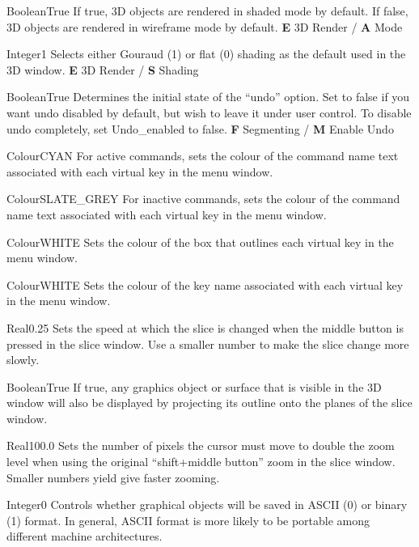 {Boolean}{True}
{If true, 3D objects are rendered in shaded mode by default. If false, 3D objects are rendered in wireframe mode by default.}
{{\bf E} 3D Render / {\bf A} Mode}

{Integer}{1}
{Selects either Gouraud (1) or flat (0) shading as the default used in the 3D window.}
{{\bf E} 3D Render / {\bf S} Shading}

{Boolean}{True}
{Determines the initial state of the ``undo'' option. Set to false if you want undo disabled by default, but wish to leave it under user control. To disable undo completely, set Undo\_enabled to false.}
{{\bf F} Segmenting / {\bf M} Enable Undo}

 {Colour}{CYAN}
{For active commands, sets the colour of the command name text
  associated with each virtual key in the menu window.}{}

 {Colour}{SLATE\_GREY}
{For inactive commands, sets the colour of the command name text
  associated with each virtual key in the menu window.}{}

{Colour}{WHITE}
{Sets the colour of the box that outlines each virtual key in the menu window.}{}

{Colour}{WHITE}
{Sets the colour of the key name associated with each virtual key in the menu window.}{}

{Real}{0.25}
{Sets the speed at which the slice is changed when the middle button is pressed in the slice window. Use a smaller number to make the slice change more slowly.}{}

{Boolean}{True}
{If true, any graphics object or surface that is visible in the 3D window will also be displayed by projecting its outline onto the planes of the slice window.}{}

{Real}{100.0}
{Sets the number of pixels the cursor must move to double the zoom level when using the original ``shift+middle button'' zoom in the slice window. Smaller numbers yield give faster zooming.}{}

 {Integer}{0} {Controls whether graphical
 objects will be saved in ASCII (0) or binary (1) format. In general,
 ASCII format is more likely to be portable among different machine
 architectures.}{}

